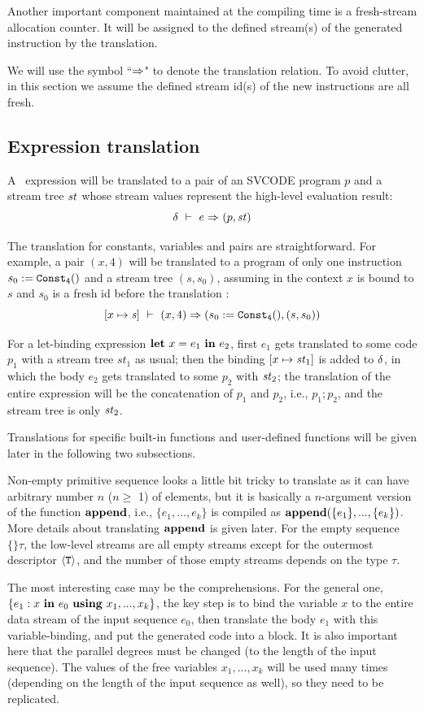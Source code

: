 Another important component maintained at the compiling time is a fresh-stream allocation counter. 
It will be assigned to the defined stream(s) of the generated instruction by the translation.

We will use the symbol ``$\Rightarrow$" to denote the translation relation. 
To avoid clutter, in this section we assume the defined stream id(s) of the new instructions are all fresh.

 
\subsection{Expression translation}


A \mysnesl \ expression will be translated to a pair of an SVCODE program $p$ and a stream tree $\mathit{st}$ whose stream values represent the high-level evaluation result:
$$ \delta \ \vdash\  e \Rightarrow^{}_{} (p,\mathit{st})$$

The translation for constants, variables and pairs are straightforward. For example, a pair $(x,4)$ will be translated to a program of only one instruction $s_0 := \mathtt{Const_{4}()}$ and a stream tree $(s,s_0)$, assuming in the context $x$ is bound to $s$ and $s_0$ is a fresh id before the translation :   
$$[x \|-> \s] \Env (x,4)  \Ra (s_0 := \constaf{4}, (s,s_0))$$ 

For a let-binding expression $\mathbf{let} \ x = e_1 \ \mathbf{in} \ e_2$,  first $e_1$ gets translated to some code $p_1$ with a stream tree $st_1$ as usual; then the binding $[x \|-> \st_1]$ is added to $\delta$, in which the body $e_2$ gets translated to some $p_2$ with $\mathit{st}_2$; the translation of the entire expression will be the concatenation of $p_1$ and $p_2$, i.e., $p_1;p_2$, and the stream tree is only $\mathit{st}_2$.

Translations for specific built-in functions and user-defined functions will be given later in the following two subsections.


Non-empty primitive sequence looks a little bit tricky to translate as it can have arbitrary  number $n$ ($ n \ge$ 1) of elements, but it is basically a $n$-argument version of the function $\mathbf{append}$,
i.e.,  $\{e_1,...,e_k\}$ is compiled as $\mathbf{append}(\{e_1\},...,\{e_k\})$. 
More details about translating $\mathbf{append}$ is given later. 
For the empty sequence $\{\}\tau$, the low-level streams are all empty streams except for the outermost descriptor $\langle \mathtt{T} \rangle$, and the number of those empty streams depends on the type $\tau$.

The most interesting case may be the comprehensions. 
For the general one, $\{e_1 : x \ \mathbf{in} \ e_0 \ \mathbf{using} \ x_1,...,x_k\}$, the key step is to bind the variable $x$ to the entire data stream of the input sequence $e_0$, then translate the body $e_1$ with this variable-binding, and put the generated code into a \wc block. 
It is also important here that the parallel degrees must be changed (to the length of the input sequence).
The values of the free variables  $x_1,...,x_k$ will be used many times (depending on the length of the input sequence as well), so they need to be replicated.

